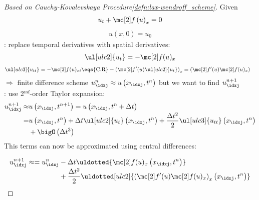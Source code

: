 \begin{proofbox}\nospacing
    \begin{proof}[\newline Based on \textit{Cauchy-Kovalevskaya Procedure}\cref{defn:lax-wendroff_scheme}]\label{proof:defn:lax-wendroff_scheme}
        Given
        \begin{align*}
        u_{t}+\flux \left(u\right)_{x}=0
        \end{align*}
        \begin{align*}
        u(x,0)=u_{0}
        \end{align*}
        : replace temporal derivatives with spatial derivatives:
        \begin{align*}
         \ul[ulc2]{u_{t}}=-\flux(u)_{x}
        \end{align*}
        \begin{align*}
         \ul[ulc3]{u_{tt}}&=-\flux(u)_{xt}\eqs{\text{C.R}}-\left(\flux'(u)\ul[ulc2]{u_{t}}\right)_{x}=\left(\flux'(u)\flux(u)_{x}\right)
        \end{align*}
        $\Rightarrow$ finite difference scheme $u_{\idxj}^{n}\approx u\left(x_{\idxj},t^{n}\right)$ but we want to find $u^{n+1}_{\idxj}$\\
        : use 2$^{nd}$-order Taylor expansion:
        \begin{align*}
          u_{\idxj}^{n+1}\approx& u \left(x_{\idxj},t^{n+1}\right)
          =u \left(x_{\idxj},t^{n}+\Delta t\right)\\[-1\jot]
          =&u \left(x_{\idxj},t^{n}\right)+\Delta t \ul[ulc2]{u_{t}} \left(x_{\idxj},t^{n}\right)+\frac{\Delta t^{2}}{2}\ul[ulc3]{u_{tt}} \left(x_{\idxj},t^{n}\right)\\[-1\jot]
          &+\bigO \left(\Delta t^{3}\right)
        \end{align*}
        This terms can now be approximated using central differences:
        \begin{figure}[H]
            \centering{
              \def\svgwidth{140pt}
              \resizebox{0.6\linewidth}{!}{}
            }
        \end{figure}
        \begin{align*}
          u_{\idxj}^{n+1}\approx=u_{\idxj}^{n}&-\Delta t\uldotted{\flux(u)_{x} \left(x_{\idxj},t^{n}\right)}\\[-1\jot]
                                  &+\frac{\Delta t^{2}}{2} \uldotted[ulc2]{\left(\flux'(u)\flux(u)_{x}\right)_{x} \left(x_{\idxj},t^{n}\right)}

\end{align*}
\end{proof}
\end{proofbox}
